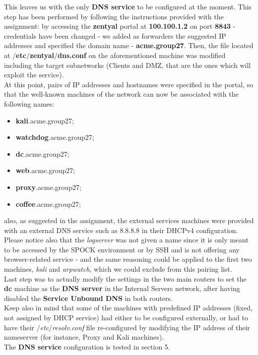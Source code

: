 This leaves us with the only \textbf{DNS service} to be configured at the moment. This step has been performed by following the instructions provided with the assignment: by accessing the \textbf{zentyal} portal at \textbf{100.100.1.2} on port \textbf{8843} - credentials have been changed - we added as forwarders the suggested IP addresses and specified the domain name - \textbf{acme.group27}. Then, the file located at \textbf{$/$etc$/$zentyal$/$dns.conf} on the aforementioned machine was modified including the target subnetworks (Clients and DMZ, that are the ones which will exploit the service).\\
At this point, pairs of IP addresses and hostnames were specified in the portal, so that the well-known machines of the network can now be associated with the following names:\\
\begin{itemize}
\item \textbf{kali}.acme.group27;
\item \textbf{watchdog}.acme.group27;
\item \textbf{dc}.acme.group27;
\item \textbf{web}.acme.group27;
\item \textbf{proxy}.acme.group27;
\item \textbf{coffee}.acme.group27;
\end{itemize}

also, as suggested in the assignment, the external services machines were provided with an external DNS service such as 8.8.8.8 in their DHCPv4 configuration. Please notice also that the \textit{logserver} was not given a name since it is only meant to be accessed by the SPOCK environment or by SSH and is not offering any browser-related service - and the same reasoning could be applied to the first two machines, \textit{kali} and \textit{arpwatch}, which we could exclude from this pairing list.\\
Last step was to actually modify the  settings in the two main routers to set the \textbf{dc} machine as the \textbf{DNS server} in the Internal Servers network, after having disabled the \textbf{Service Unbound DNS} in both routers.\\
Keep also in mind that some of the machines with predefined IP addresses (fixed, not assigned by DHCP service) had either to be configured externally, or had to have their \textit{$/$etc$/$resolv.conf} file re-configured by modifying the IP address of their nameserver (for instance, Proxy and Kali machines).\\
The \textbf{DNS service} configuration is tested in section 5.

